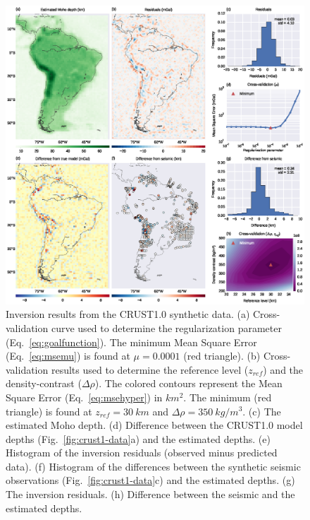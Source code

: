 \documentclass[extra]{gji}
\begin{document}
\begin{figure}
    \centering
    \includegraphics[width=\textwidth]{figures/synthetic-crust1-results}
    \caption{
        Inversion results from the CRUST1.0 synthetic data.
        (a) Cross-validation curve used to determine
        the regularization parameter (Eq.~\ref{eq:goalfunction}).
        The minimum Mean Square Error (Eq.~\ref{eq:msemu}) is found at
        $\mu = 0.0001$ (red triangle).
        (b) Cross-validation results used to determine
        the reference level ($z_{ref}$) and the density-contrast ($\Delta\rho$).
        The colored contours represent
        the Mean Square Error (Eq.~\ref{eq:msehyper}) in $km^2$.
        The minimum (red triangle) is found at $z_{ref} = 30\ km$
        and $\Delta\rho = 350\ kg/m^3$.
        (c) The estimated Moho depth.
        (d) Difference between the CRUST1.0 model depths
        (Fig.~\ref{fig:crust1-data}a)
        and the estimated depths.
        (e) Histogram of the inversion residuals
        (observed minus predicted data).
        (f) Histogram of the differences between
        the synthetic seismic observations (Fig.~\ref{fig:crust1-data}c)
        and the estimated depths.
        (g) The inversion residuals.
        (h) Difference between the seismic and the estimated depths.
    }
    \label{fig:crust1-results}
\end{figure}
\end{document}
